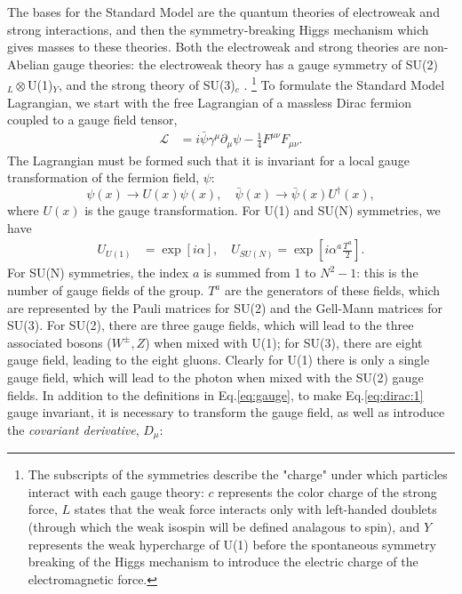 \documentclass[a4paper,12pt]{article}
\begin{document}
The bases for the Standard Model are the quantum theories of electroweak and strong interactions, and then the symmetry-breaking Higgs mechanism which gives masses to these theories.
Both the electroweak and strong theories are non-Abelian gauge theories: the electroweak theory has a gauge symmetry of SU(2)$_{L}\otimes$U(1)$_Y$, and the strong theory of SU(3)$_{c}$ \cite{n}.
\hspace{-10pt}\footnote{The subscripts of the symmetries describe the "charge" under which particles interact with each gauge theory: $c$ represents the color charge of the strong force, $L$ states that the weak force interacts only with left-handed doublets (through which the weak isospin will be defined analagous to spin), and $Y$ represents the weak hypercharge of U(1) before the spontaneous symmetry breaking of the Higgs mechanism to introduce the electric charge of the electromagnetic force.\cite{o}}
\hspace{-5pt}To formulate the Standard Model Lagrangian, we start with the free Lagrangian of a massless Dirac fermion coupled to a gauge field tensor,
\begin{align}
    \label{eq:dirac:1}
    \mathcal{L} &= i\bar{\psi}\gamma^\mu\partial_\mu\psi - \frac14F^{\mu\nu}F_{\mu\nu}.
\end{align}
The Lagrangian must be formed such that it is invariant for a local gauge transformation of the fermion field, $\psi$:
\begin{equation}
    \label{eq:local}
    \psi(x)\to U(x)\psi(x),\quad \bar{\psi}(x)\to\bar{\psi}(x)U^\dagger(x),
\end{equation}
where $U(x)$ is the gauge transformation.
For U(1) and SU(N) symmetries, we have
\begin{align}
    \label{eq:gauge} 
    U_{U(1)} &= \exp\left[i\alpha\right],\quad U_{SU(N)} = \exp\left[i\alpha^a\frac{T^a}{2}\right].
\end{align}
For SU(N) symmetries, the index $a$ is summed from 1 to $N^2-1$: this is the number of gauge fields of the group.
$T^a$ are the generators of these fields, which are represented by the Pauli matrices for SU(2) and the Gell-Mann matrices for SU(3).
For SU(2), there are three gauge fields, which will lead to the three associated bosons ($W^{\pm},Z$) when mixed with U(1); for SU(3), there are eight gauge field, leading to the eight gluons.
Clearly for U(1) there is only a single gauge field, which will lead to the photon when mixed with the SU(2) gauge fields.
In addition to the definitions in Eq.\eqref{eq:gauge}, to make Eq.\eqref{eq:dirac:1} gauge invariant, it is necessary to transform the gauge field, as well as introduce the \textit{covariant derivative}, $D_\mu$:
\end{document}
